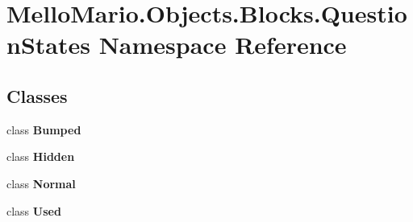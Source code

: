 \section{Mello\+Mario.\+Objects.\+Blocks.\+Question\+States Namespace Reference}
\label{namespaceMelloMario_1_1Objects_1_1Blocks_1_1QuestionStates}
\subsection*{Classes}
\begin{DoxyCompactItemize}
\item 
class \textbf{ Bumped}
\item 
class \textbf{ Hidden}
\item 
class \textbf{ Normal}
\item 
class \textbf{ Used}
\end{DoxyCompactItemize}
